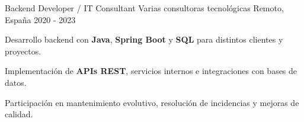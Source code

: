   \cventry
    {Backend Developer / IT Consultant}
    {Varias consultoras tecnológicas}
  {Remoto, España}
  {2020 - 2023}
  {
    \begin{cvitems}
      \item {Desarrollo backend con \textbf{Java}, \textbf{Spring Boot} y \textbf{SQL} para distintos clientes y proyectos.}
      \item {Implementación de \textbf{APIs REST}, servicios internos e integraciones con bases de datos.}
      \item {Participación en mantenimiento evolutivo, resolución de incidencias y mejoras de calidad.}
    \end{cvitems}
  }
